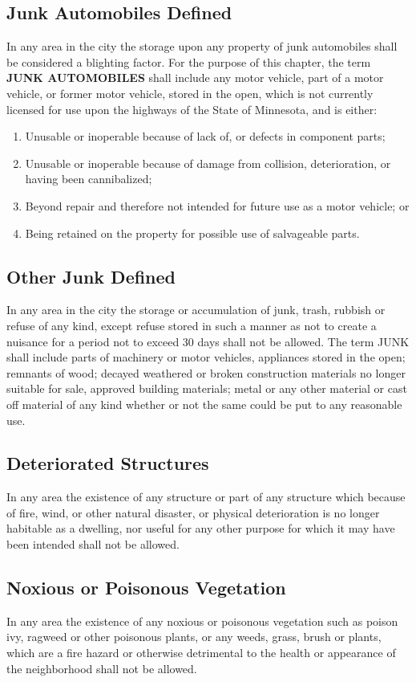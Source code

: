 \subsection{Junk Automobiles Defined}
In any area in the city the storage upon any property of junk automobiles shall be considered a blighting factor. For the purpose of this chapter, the term \textbf{JUNK AUTOMOBILES} shall include any motor vehicle, part of a motor vehicle, or former motor vehicle, stored in the open, which is not currently licensed for use upon the highways of the State of Minnesota, and is either:
\begin{enumerate}[{\indent}1)]
    \item Unusable or inoperable because of lack of, or defects in component parts;
    \item Unusable or inoperable because of damage from collision, deterioration, or having been cannibalized;
    \item Beyond repair and therefore not intended for future use as a motor vehicle; or 
    \item Being retained on the property for possible use of salvageable parts.
\end{enumerate}
\subsection{Other Junk Defined}
In any area in the city the storage or accumulation of junk, trash, rubbish or refuse of any kind, except refuse stored in such a manner as not to create a nuisance for a period not to exceed 30 days shall not be allowed. The term JUNK shall include parts of machinery or motor vehicles, appliances stored in the open; remnants of wood; decayed weathered or broken construction materials no longer suitable for sale, approved building materials; metal or any other material or cast off material of any kind whether or not the same could be put to any reasonable use.
\subsection{Deteriorated Structures}
In any area the existence of any structure or part of any structure which because of fire, wind, or other natural disaster, or physical deterioration is no longer habitable as a dwelling, nor useful for any other purpose for which it may have been intended shall not be allowed.
\subsection{Noxious or Poisonous Vegetation}
In any area the existence of any noxious or poisonous vegetation such as poison ivy, ragweed or other poisonous plants, or any weeds, grass, brush or plants, which are a fire hazard or otherwise detrimental to the health or appearance of the neighborhood shall not be allowed.
